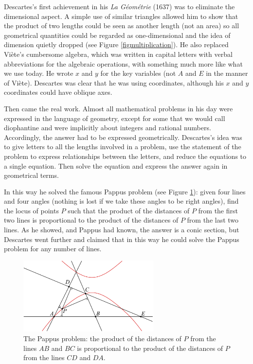 Descartes's first achievement in his \emph{La G\'eom\'etrie} (1637) was to eliminate the dimensional aspect. A simple use of similar triangles allowed him to show that the product of two lengths could be seen as another length (not an area) so all geometrical quantities could be regarded as one-dimensional and the idea of dimension quietly dropped (see Figure \ref{figmultiplication}). He also replaced Vi\`ete's cumbersome algebra, which was written in capital letters with verbal abbreviations for the algebraic operations, with something much more like   what we use today.  He wrote $x$ and $y$ for the key variables (not $A$ and $E$ in the manner of Vi\`ete). Descartes was clear that he was using coordinates, although his $x$ and $y$ coordinates could have oblique axes.


Then came the real work. Almost all mathematical problems in his day
were expressed in the language of geometry, except for some that
we would call diophantine and were implicitly about integers and
rational numbers. Accordingly, the answer had to be expressed
geometrically. Descartes's idea was to give letters to all the lengths
involved in a problem, use the statement of the problem to express
relationships between the letters, and reduce the equations to a
single equation. Then solve the equation and express the answer again
in geometrical terms. 

 In this way he solved the famous Pappus problem (see Figure \ref{figPappusproblem}): given four lines and four angles (nothing is lost if we take these angles to be right angles), find the locus of points $P$ such that the product of the distances of $P$ from the first two lines is proportional to the product of the distances of $P$ from the last two lines. As he showed, and Pappus had known, the answer is a conic section, but  Descartes went further and claimed that in this way he could solve the Pappus problem for any number of lines. 
 
\begin{figure}
\includegraphics[width=200pt]{main/Pappusproblem} 
\caption{The Pappus problem: the product of the distances of $P$ from the lines $AB$ and $BC$ is proportional to the product of the distances of $P$ from the lines $CD$ and $DA$.}
\label{figPappusproblem}
\end{figure}

